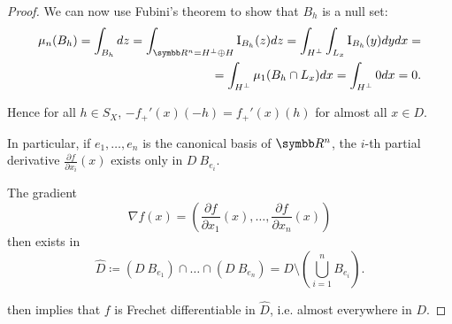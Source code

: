 \begin{proof}
  We can now use Fubini's theorem to show that \( B_h \) is a null set:
  \begin{align*}
    \mu_n(B_h)
    =
    \int_{B_h} dz
    =
    \int_{\BB{R}^n = H^\perp \oplus H} \Ind_{B_h} (z) dz
    =
    \int_{H^\perp} \int_{L_x} \Ind_{B_h} (y) dy dx
    = \\ =
    \int_{H^\perp} \mu_1(B_h \cap L_x) dx
    =
    \int_{H^\perp} 0 dx
    =
    0.
  \end{align*}

  Hence for all \( h \in S_X \), \( -f_+'(x)(-h) = f_+'(x)(h) \) for almost all \( x \in D \).

  In particular, if \( e_1, \ldots, e_n \) is the canonical basis of \( \BB{R}^n \), the \( i \)-th partial derivative \( \frac{\partial f} {\partial x_i} (x) \) exists only in \( D \ B_{e_i} \).

  The gradient
  \begin{equation*}
    \nabla f(x) = \left( \frac{\partial f} {\partial x_1} (x), \ldots, \frac{\partial f} {\partial x_n} (x) \right)
  \end{equation*}
  then exists in
  \begin{equation*}
    \hat D \coloneqq (D \ B_{e_1}) \cap \ldots \cap (D \ B_{e_n}) = D \setminus \left( \bigcup_{i=1}^n B_{e_i} \right).
  \end{equation*}

   then implies that \( f \) is Frechet differentiable in \( \hat D \), i.e. almost everywhere in \( D \).
\end{proof}
